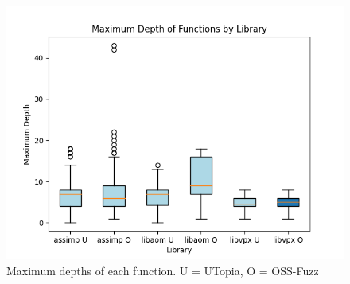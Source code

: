 \documentclass[a4paper,11pt,oneside]{report}
\begin{document}
\begin{figure}[h]
	\centering
	\includegraphics[width=12cm]{figures/max_depths.png}
	\caption{Maximum depths of each function. U = UTopia, O = OSS-Fuzz}
	\label{fig:max_depths}
\end{figure}
\end{document}
